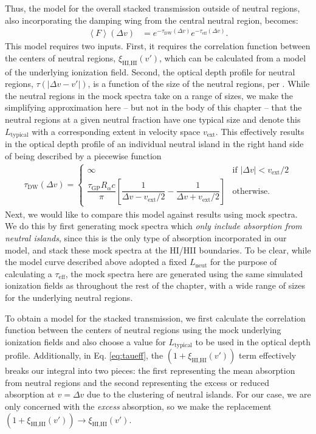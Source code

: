 Thus, the model for the overall stacked transmission outside of neutral regions, also incorporating the damping wing from the central neutral region, becomes:
\begin{align}
\left\langle F \right\rangle (\Delta v) &= e^{-\tau_{\text{DW}}(\Delta v)}e^{-\tau_{\text{eff}}(\Delta v)}.
\end{align}
This model requires two inputs. First, it requires the correlation function between the centers of neutral regions, $\xi_{\text{HI,HI}}(v')$, which can be calculated from a model of the underlying ionization field. Second, the optical depth profile for neutral regions, $\tau (|\Delta v - v'|)$, is a function of the size of the neutral regions, per . While the neutral regions in the mock spectra take on a range of sizes, we make the simplifying approximation here -- but not in the body of this chapter -- that the neutral regions at a given neutral fraction have one typical size and denote this $L_{\text{typical}}$ with a corresponding extent in velocity space $v_{\text{ext}}$. This effectively results in the optical depth profile of an individual neutral island in the right hand side of  being described by a piecewise function
\begin{align}
\tau_{\text{DW}}(\Delta v) = \begin{cases} \infty &\mbox{if } |\Delta v| < v_{\text{ext}}/2 \\ \dfrac{\tau_{\text{GP}}R_{\alpha}c}{\pi}\left[ \dfrac{1}{\Delta v - v_{\text{ext}}/2} - \dfrac{1}{\Delta v + v_{\text{ext}}/2} \right] &\mbox{otherwise.} \end{cases}
\end{align}
Next, we would like to compare this model against results using mock spectra. We do this by first generating mock spectra which \textit{only include absorption from neutral islands}, since this is the only type of absorption incorporated in our model, and stack these mock spectra at the HI/HII boundaries. To be clear, while the model curve described above adopted a fixed $L_{\text{neut}}$ for the purpose of calculating a $\tau_{\text{eff}}$, the mock spectra here are generated using the same simulated ionization fields as throughout the rest of the chapter, with a wide range of sizes for the underlying neutral regions. 

To obtain a model for the stacked transmission, we first calculate the correlation function between the centers of neutral regions using the mock underlying ionization fields and also choose a value for $L_{\text{typical}}$ to be used in the optical depth profile. Additionally, in Eq. \ref{eq:taueff}, the $(1 + \xi_{\text{HI,HI}}(v'))$ term effectively breaks our integral into two pieces: the first representing the mean absorption from neutral regions and the second representing the excess or reduced absorption at $v = \Delta v$ due to the clustering of neutral islands. For our case, we are only concerned with the \textit{excess} absorption, so we make the replacement $(1 + \xi_{\text{HI,HI}}(v')) \to \xi_{\text{HI,HI}}(v')$.


